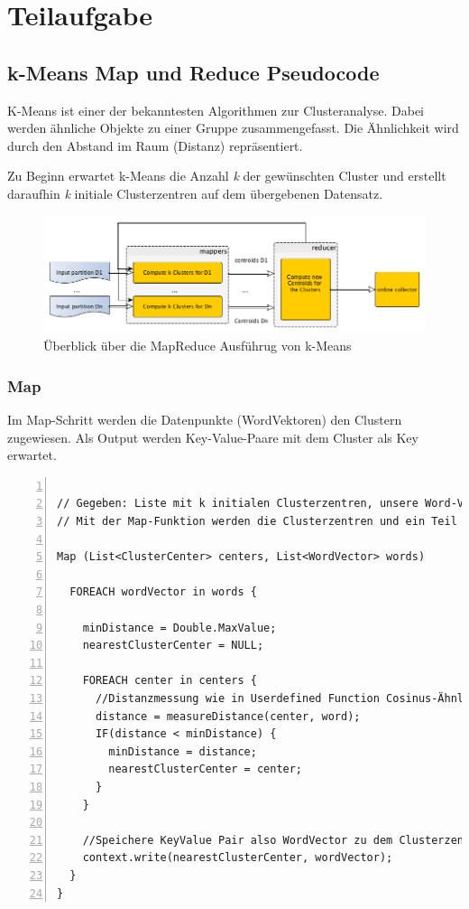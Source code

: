 \section{Teilaufgabe}

\subsection{k-Means Map und Reduce Pseudocode}
K-Means ist einer der bekanntesten Algorithmen zur Clusteranalyse. Dabei werden ähnliche Objekte zu einer Gruppe zusammengefasst. Die Ähnlichkeit wird durch den Abstand im Raum (Distanz) repräsentiert. 

Zu Beginn erwartet k-Means die Anzahl \emph{k} der gewünschten Cluster und erstellt daraufhin \emph{k} initiale Clusterzentren auf dem übergebenen Datensatz.

\begin{figure}[htb]
\includegraphics[scale=0.5]{MapReduceBild.png}
\centering
\caption{Überblick über die MapReduce Ausführug von k-Means}
\label{fig:MapRed}
\end{figure}

\subsubsection{Map}
Im Map-Schritt werden die Datenpunkte (WordVektoren) den Clustern zugewiesen. Als Output werden Key-Value-Paare mit dem Cluster als Key erwartet. 
\begin{lstlisting}[caption=Map Pseudocode,label=lst:map,numbers=left,xleftmargin=2em,
framexleftmargin=2em,morekeywords={FOREACH, IF, NULL}]

// Gegeben: Liste mit k initialen Clusterzentren, unsere Word-Vektoren
// Mit der Map-Funktion werden die Clusterzentren und ein Teil der Word-Vektoren als Argumente übergeben

Map (List<ClusterCenter> centers, List<WordVector> words) 

  FOREACH wordVector in words {
  
    minDistance = Double.MaxValue;
    nearestClusterCenter = NULL;  
  
    FOREACH center in centers {
      //Distanzmessung wie in Userdefined Function Cosinus-Ähnlichkeit 
      distance = measureDistance(center, word);
      IF(distance < minDistance) {
        minDistance = distance;
        nearestClusterCenter = center;
      }
    }
    
    //Speichere KeyValue Pair also WordVector zu dem Clusterzentrum 
    context.write(nearestClusterCenter, wordVector);
  }
}
\end{lstlisting}

